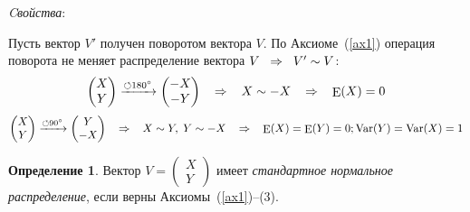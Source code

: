 \documentclass[12pt]{article} %
\theoremstyle{definition} %
\DeclareMathOperator{\Var}{Var}
\DeclareMathOperator{\E}{E}
\begin{document}
\textit{Cвойства}: \par
Пусть вектор $V'$ получен поворотом вектора $V$. По Аксиоме~(\ref{ax1}) операция поворота не меняет распределение вектора $V \hspace{0.2cm} \Rightarrow \hspace{0.2cm} V' \sim V$:
\bigskip
\[
\begin{pmatrix}
  X \\
  Y
\end{pmatrix} \xrightarrow{\circlearrowleft \space 180^{\circ}}
\begin{pmatrix}
  -X \\
  -Y
  \end{pmatrix} \hspace{0.3cm}
  \Rightarrow \hspace{0.3cm} X \sim -X \hspace{0.3cm}
  \Rightarrow \hspace{0.3cm} \E(X)=0
\]
\medskip
\[
\begin{pmatrix}
  X \\
  Y
\end{pmatrix} \xrightarrow{\circlearrowleft \space 90^{\circ}}
\begin{pmatrix}
  Y \\
  -X
\end{pmatrix} \hspace{0.3cm} \Rightarrow \hspace{0.3cm} X \sim Y, \; Y \sim -X \hspace{0.3cm}
\Rightarrow \hspace{0.3cm} \E(X)=\E(Y)=0; \Var(Y)=\Var(X)=1
\]

\newtheorem*{define}{Определение}
\begin{define}
Вектор $ V = \begin{pmatrix} X \\ Y \end{pmatrix}$ имеет \emph{стандартное нормальное распределение}, если верны Аксиомы~(\ref{ax1})--(3).
\end{define}
\end{document}
